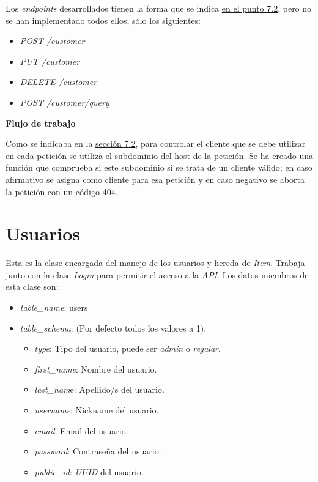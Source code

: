 \bigskip
Los \textit{endpoints} desarrollados tienen la forma que se indica \hyperref[sec:servicios]{en el punto 7.2}, pero no se han implementado todos ellos, sólo los siguientes:
\begin{itemize}
	\item \textit{POST /customer}
	\item \textit{PUT /customer}
	\item \textit{DELETE /customer}
	\item \textit{POST /customer/query}
\end{itemize}


\bigskip
\textbf{Flujo de trabajo}

Como se indicaba en la \hyperref[sec:servicios]{sección 7.2}, para controlar el cliente que se debe utilizar en cada petición se utiliza el subdominio del host de la petición. Se ha creado una función que comprueba si este subdominio si se trata de un cliente válido; en caso afirmativo se asigna como cliente para esa petición y en caso negativo se aborta la petición con un código 404.




\section{Usuarios}


Esta es la clase encargada del manejo de los usuarios y hereda de \textit{Item}. Trabaja junto con la clase \textit{Login} para permitir el acceso a la \textit{API}. Los datos miembros de esta clase son:
\begin{itemize}
	\item \textit{table\_name}: users
	\item \textit{table\_schema}: (Por defecto todos los valores a 1).
	\begin{itemize}
		\item \textit{type}: Tipo del usuario, puede ser \textit{admin} o \textit{regular}.
		\item \textit{first\_name}: Nombre del usuario.
		\item \textit{last\_nam}e: Apellido/s del usuario.
		\item \textit{username}: Nickname del usuario.
		\item \textit{email}: Email del usuario.
		\item \textit{password}: Contraseña del usuario.
		\item \textit{public\_id}: \textit{UUID} del usuario.
	\end{itemize}
\end{itemize}


